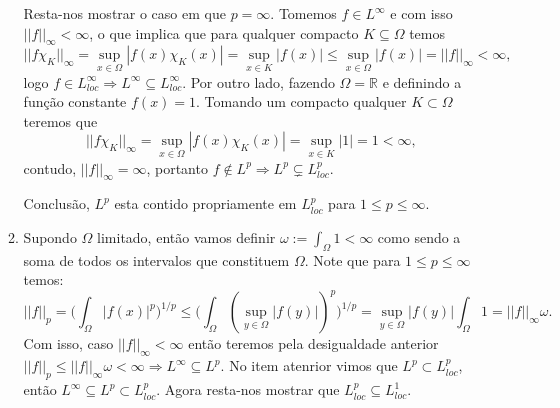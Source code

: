 \documentclass{article}
\begin{document}
\begin{enumerate}
\begin{enumerate}
			Resta-nos mostrar o caso em que $p=\infty$. Tomemos $f \in L^{\infty}$ e com isso $||f||_{\infty} < \infty$, o que implica que para qualquer compacto $K \subseteq \Omega$ temos 
			$$
			||f\chi_{K}||_{\infty} = \sup_{x \in \Omega}|f(x)\chi_{K} (x)|= \sup_{x \in K}|f(x)| \leq \sup_{x \in \Omega}|f(x)| = ||f||_{\infty} < \infty,
			$$
			logo $f \in L^{\infty}_{loc} \Rightarrow L^{\infty} \subseteq L^{\infty}_{loc}$. Por outro lado, fazendo $\Omega = \mathbb{R}$ e definindo a função constante $f(x) = 1$. Tomando um compacto qualquer $K \subset \Omega$ teremos que 
			$$
			||f \chi_{K}||_{\infty} = \sup_{x \in \Omega}|f(x)\chi_{K} (x)| = \sup_{x \in K}|1| = 1 < \infty,
			$$
			contudo, 
			$||f||_{\infty} = \infty$, portanto $f \notin L^{p} \Rightarrow L^{p} \subsetneq L^{p}_{loc}$.
			
			Conclusão, $L^{p}$ esta contido propriamente em $L^{p}_{loc}$ para $1 \leq p \leq \infty$.
			
			\item Supondo $\Omega$ limitado, então vamos definir $\omega := \int_{\Omega} 1 < \infty$ como sendo a soma de todos os intervalos que constituem $\Omega$. Note que para $1 \leq p \leq \infty$ temos:
			$$
			||f||_{p} = \Big( \int_{\Omega} |f(x)|^{p} \Big)^{1/p} \leq \Big( \int_{\Omega} (\sup_{y \in \Omega}|f(y)|)^{p} \Big)^{1/p} = \sup_{y \in \Omega}|f(y)|\int_{\Omega} 1 = ||f||_{\infty}\omega.
			$$
			Com isso, caso $||f||_{\infty} < \infty$ então teremos pela desigualdade anterior $||f||_{p} \leq ||f||_{\infty}\omega < \infty \Rightarrow L^{\infty} \subseteq L^{p}$. No item atenrior vimos que $L^{p} \subset L^{p}_{loc}$, então $L^{\infty } \subseteq L^{p} \subset L^{p}_{loc}$. Agora resta-nos mostrar que $L^{p}_{loc} \subseteq L^{1}_{loc}$.
		\end{enumerate}
	\end{enumerate}
	
\end{document}

